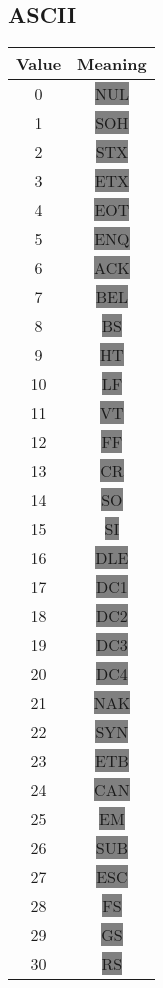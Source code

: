 \subsection{ASCII}

{\scriptsize\ttfamily\begin{tabular}{c c}
  \hline
  Value & Meaning \\
  \hline
    0 & \colorbox{gray}{NUL} \\
    1 & \colorbox{gray}{SOH} \\
    2 & \colorbox{gray}{STX} \\
    3 & \colorbox{gray}{ETX} \\
    4 & \colorbox{gray}{EOT} \\
    5 & \colorbox{gray}{ENQ} \\
    6 & \colorbox{gray}{ACK} \\
    7 & \colorbox{gray}{BEL} \\
    8 & \colorbox{gray}{BS} \\
    9 & \colorbox{gray}{HT} \\
   10 & \colorbox{gray}{LF} \\
   11 & \colorbox{gray}{VT} \\
   12 & \colorbox{gray}{FF} \\
   13 & \colorbox{gray}{CR} \\
   14 & \colorbox{gray}{SO} \\
   15 & \colorbox{gray}{SI} \\
   16 & \colorbox{gray}{DLE} \\
   17 & \colorbox{gray}{DC1} \\
   18 & \colorbox{gray}{DC2} \\
   19 & \colorbox{gray}{DC3} \\
   20 & \colorbox{gray}{DC4} \\
   21 & \colorbox{gray}{NAK} \\
   22 & \colorbox{gray}{SYN} \\
   23 & \colorbox{gray}{ETB} \\
   24 & \colorbox{gray}{CAN} \\
   25 & \colorbox{gray}{EM} \\
   26 & \colorbox{gray}{SUB} \\
   27 & \colorbox{gray}{ESC} \\
   28 & \colorbox{gray}{FS} \\
   29 & \colorbox{gray}{GS} \\
   30 & \colorbox{gray}{RS} \\

\end{tabular}}
